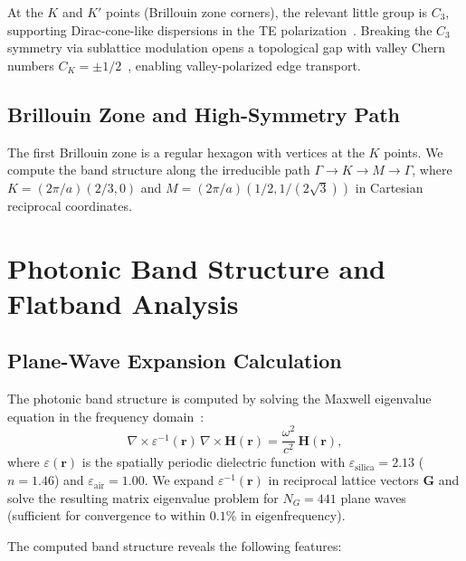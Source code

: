 \documentclass[10pt,letterpaper]{article}
\begin{document}
At the $K$ and $K'$ points (Brillouin zone corners), the relevant little group is $C_3$, supporting Dirac-cone-like dispersions in the TE polarization~\cite{Wu2017}. Breaking the $C_3$ symmetry via sublattice modulation opens a topological gap with valley Chern numbers $C_K = \pm 1/2$~\cite{Ozawa2019,Hafezi2013}, enabling valley-polarized edge transport.

\subsection{Brillouin Zone and High-Symmetry Path}

The first Brillouin zone is a regular hexagon with vertices at the $K$ points. We compute the band structure along the irreducible path $\Gamma \to K \to M \to \Gamma$, where $K = (2\pi/a)(2/3, 0)$ and $M = (2\pi/a)(1/2, 1/(2\sqrt{3}))$ in Cartesian reciprocal coordinates.


\section{Photonic Band Structure and Flatband Analysis}
\label{sec:bandstructure}

\subsection{Plane-Wave Expansion Calculation}

The photonic band structure is computed by solving the Maxwell eigenvalue equation in the frequency domain~\cite{Joannopoulos2008}:
\begin{equation}
\nabla \times \varepsilon^{-1}(\mathbf{r})\,\nabla \times \mathbf{H}(\mathbf{r}) = \frac{\omega^2}{c^2}\,\mathbf{H}(\mathbf{r}),
\label{eq:maxwell}
\end{equation}
where $\varepsilon(\mathbf{r})$ is the spatially periodic dielectric function with $\varepsilon_\mathrm{silica} = 2.13$ ($n = 1.46$) and $\varepsilon_\mathrm{air} = 1.00$. We expand $\varepsilon^{-1}(\mathbf{r})$ in reciprocal lattice vectors $\mathbf{G}$ and solve the resulting matrix eigenvalue problem for $N_G = 441$ plane waves (sufficient for convergence to within $0.1\%$ in eigenfrequency).

The computed band structure reveals the following features:
\end{document}
